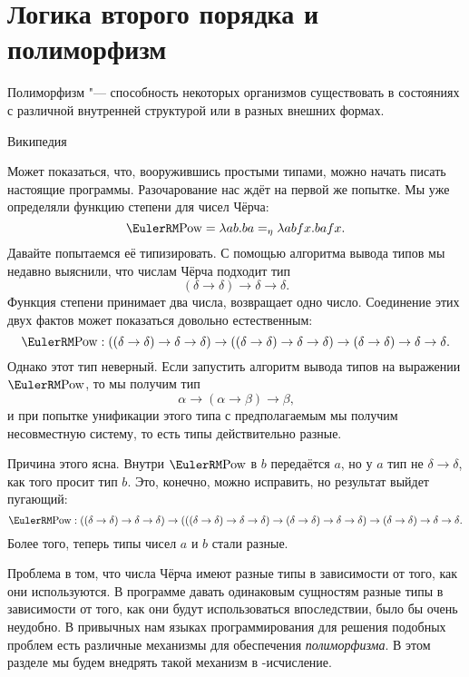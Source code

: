 \section{\texorpdfstring{Логика второго порядка и полиморфизм}{Second-order logic and polymorphism}}

\epigraph{Полиморфизм "--- способность некоторых организмов
существовать в состояниях с различной внутренней структурой или в разных внешних формах.}
{Википедия}

Может показаться, что, вооружившись простыми типами, можно начать писать настоящие программы.
Разочарование нас ждёт на первой же попытке.
Мы уже определяли функцию степени для чисел Чёрча:
\[
    \func{Pow} = \lambda{}a b.b a =_\eta \lambda{}a b f x.b a f x\text{.}
\]
Давайте попытаемся её типизировать.
С помощью алгоритма вывода типов мы недавно выяснили, что числам Чёрча подходит тип
\[
    (\delta\to\delta)\to\delta\to\delta\text{.}
\]
Функция степени принимает два числа, возвращает одно число.
Соединение этих двух фактов может показаться довольно естественным:
\[
    \func{Pow}:((\delta\to\delta)\to\delta\to\delta)\to((\delta\to\delta)\to\delta\to\delta)\to(\delta\to\delta)\to\delta\to\delta\text{.}
\]
Однако этот тип неверный. Если запустить алгоритм вывода типов на выражении $\func{Pow}$, то мы получим тип
\[
    \alpha \to (\alpha \to \beta) \to \beta\text{,}
\]
и при попытке унификации этого типа с предполагаемым мы получим несовместную систему, то есть типы действительно разные.

Причина этого ясна.
Внутри $\func{Pow}$ в $b$ передаётся $a$, но у $a$ тип не $\delta \to \delta$, как того просит тип $b$.
Это, конечно, можно исправить, но результат выйдет пугающий:
\[
    \func{Pow}:((\delta\to\delta)\to\delta\to\delta)\to(((\delta\to\delta)\to\delta\to\delta)\to(\delta\to\delta)\to\delta\to\delta)\to(\delta\to\delta)\to\delta\to\delta\text{.}
\]
Более того, теперь типы чисел $a$ и $b$ стали разные.

Проблема в том, что числа Чёрча имеют разные типы в зависимости от того, как они используются.
В программе давать одинаковым сущностям разные типы в зависимости от того,
как они будут использоваться впоследствии, было бы очень неудобно.
В привычных нам языках программирования для решения подобных проблем есть различные механизмы для обеспечения \emph{полиморфизма}.
В этом разделе мы будем внедрять такой механизм в \textlambda-исчисление.


